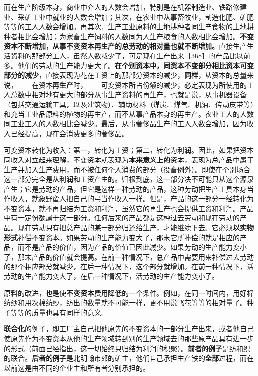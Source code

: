 而在生产阶级本身，商业中介人的人数会增加，特别是在机器制造业、铁路修建业、采矿工业中就业的人数会增加；其次，在农业中从事畜牧业，制造化肥、矿肥等等的工人人数会增加。再其次，生产工业原料的土地耕种者同生产食物的土地耕种者相比会增加；为家畜生产饲料的人数同为人生产粮食的人数相比会增加。\textbf{不变资本不断增加，从事不变资本再生产的总劳动的相对量也就不断增加。}直接生产生活资料的那部分工人，虽然人数减少了，可是现在生产出来［368］的产品比以前多。他们的劳动的生产能力更大了。\textbf{在个别资本中，同资本不变部分相比资本可变部分的减少}，直接表现为花在工资上的那部分资本的减少，\textbf{同样}，从资本的总量来说，——在资本\textbf{再生产}时，——可变资本所占份额的减少，必定表现为所使用的工人总数中相对地有更大的部分从事生产资料的再生产，也就是说，从事机器设备（包括交通运输工具，以及建筑物）、辅助材料（煤炭、煤气、机油、传动皮带等）和充当工业品原料的植物的再生产，而不从事产品本身的再生产。农业工人的人数同工业工人的人数相比会减少。最后，从事奢侈品生产的工人人数会增加，因为收入已经提高，现在会消费更多的奢侈品。\fontbox{\}~}


\fontbox{~\{}可变资本转化为收入：第一，转化为工资；第二，转化为利润。因此，如果把资本同收入对立起来理解，不变资本就表现为\textbf{本来意义上的}资本，表现为总产品中属于生产并加入生产费用，而不被任何个人消费的部分（役畜例外）。即使在个别场合这一部分完全是从利润和工资产生的。归根到底，这一部分决不可能只从这个源泉产生；它是劳动的产品，但它是这样一种劳动的产品，这种劳动把生产工具本身当作收入，就象野蛮人把自己的弓当作收入一样。但是，产品的这一部分一经转化为不变资本，就不再归结为工资和利润，虽然它的再生产也会提供工资和利润。产品中有一定份额属于这一部分。任何后来的产品都是这种过去劳动和现在劳动的产品。现在劳动只有把总产品的某一部分归还给生产，才能继续下去。它必须\textbf{以实物形式}补偿不变资本。如果劳动的生产能力变大了，那末它所补偿的就是相应的产品，而不是产品的价值，因为产品的价值已因此减少。如果劳动的生产能力变小了，那末产品的价值就会提高。在前一种情况下，总产品中需要用来补偿过去劳动的那个相应部分就减少，在后一种情况下，这个部分就增加。在前一种情况下，活劳动的生产能力变大了，在后一种情况下，活劳动的生产能力变小了。\fontbox{\}~}

\fontbox{~\{}原料的改进，也是使\textbf{不变资本}费用降低的一个条件。例如，在同一时间内，用好棉纺纱和用次棉纺纱，纺出的数量就不可能一样，更不用说飞花等等的相对量了。种子等等的质量也具有同样的意义。\fontbox{\}~}

\fontbox{~\{}\textbf{联合化}的例子，即工厂主自己把他原先的不变资本的一部分生产出来，或者他自己使原先作为不变资本从他的生产领域转到别的生产领域去的那些原产品具有进一步的形式（前面已经指出，这一切始终只归结为利润的积聚）。\textbf{前者的例子}是纺和织的联合。\textbf{后者的例子}是北明翰市郊的矿主，他们自己承担生产铁的\textbf{全部}过程，而在以前这是由不同的企业主和所有者分别承担的。\fontbox{\}~}

